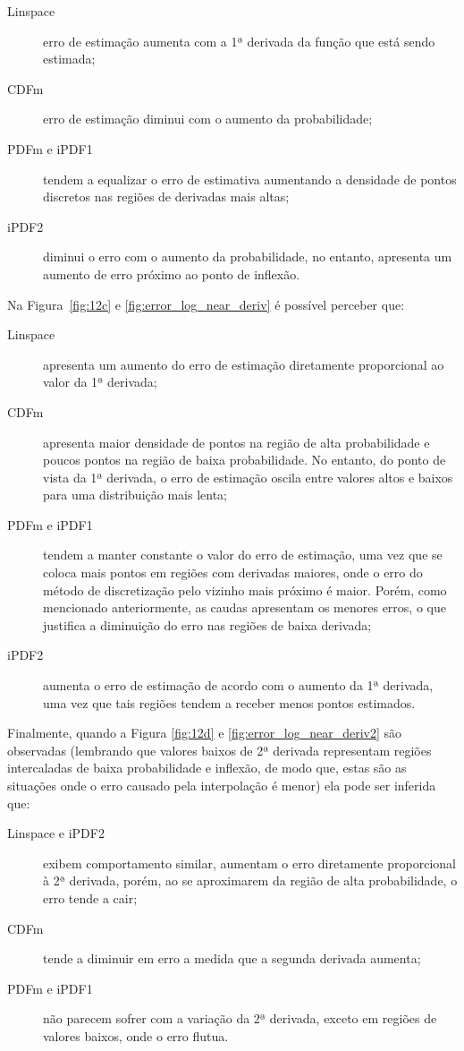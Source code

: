 \begin{description}
	\item[Linspace] erro de estimação aumenta com a 1ª derivada da função que está sendo estimada;
	\item[CDFm] erro de estimação diminui com o aumento da probabilidade; 
	\item[PDFm e iPDF1] tendem a equalizar o erro de estimativa aumentando a densidade de pontos discretos nas regiões de derivadas mais altas; 
	\item[iPDF2] diminui o erro com o aumento da probabilidade, no entanto, apresenta um aumento de erro próximo ao ponto de inflexão.
\end{description}  

Na Figura~\ref{fig:12c} e \ref{fig:error_log_near_deriv} é possível perceber que:
\begin{description}
	\item[Linspace] apresenta um aumento do erro de estimação diretamente proporcional ao valor da 1ª derivada;
	\item[CDFm] apresenta maior densidade de pontos na região de alta probabilidade e poucos pontos na região de baixa probabilidade. No entanto, do ponto de vista da 1ª derivada, o erro de estimação oscila entre valores altos e baixos para uma distribuição mais lenta;
	\item[PDFm e iPDF1] tendem a manter constante o valor do erro de estimação, uma vez que se coloca mais pontos em regiões com derivadas maiores, onde o erro do método de discretização pelo vizinho mais próximo é maior. Porém, como mencionado anteriormente, as caudas apresentam os menores erros, o que justifica a diminuição do erro nas regiões de baixa derivada;
	\item[iPDF2] aumenta o erro de estimação de acordo com o aumento da 1ª derivada, uma vez que tais regiões tendem a receber menos pontos estimados.
\end{description}  

Finalmente, quando a Figura \ref{fig:12d} e \ref{fig:error_log_near_deriv2} são observadas (lembrando que valores baixos de 2ª derivada representam regiões intercaladas de baixa probabilidade e inflexão, de modo que, estas são as situações onde o erro causado pela interpolação é menor) ela pode ser inferida que:

\begin{description}
	\item[Linspace e iPDF2] exibem comportamento similar, aumentam o erro diretamente proporcional à 2ª derivada, porém, ao se aproximarem da região de alta probabilidade, o erro tende a cair;
	\item[CDFm] tende a diminuir em erro a medida que a segunda derivada aumenta;
	\item[PDFm e iPDF1] não parecem sofrer com a variação da 2ª derivada, exceto em regiões de valores baixos, onde o erro flutua.
\end{description}

